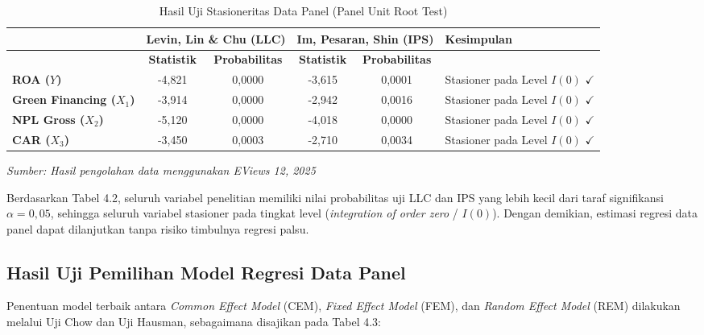 \documentclass[12pt,a4paper]{article}
\numberwithin{equation}{section}
\begin{document}
\begin{table}[H]
  \caption{Hasil Uji Stasioneritas Data Panel (Panel Unit Root Test)}
  \label{tab:unit_root}
  \begin{tabularx}{\textwidth}{|>{\raggedright\arraybackslash}p{2.4cm}|c|c|c|c|>{\raggedright\arraybackslash}X|}
    \hline
    \multirow{2}{*}{\textbf{Variabel}} & \multicolumn{2}{c|}{\textbf{Levin, Lin \& Chu (LLC)}} & \multicolumn{2}{c|}{\textbf{Im, Pesaran, Shin (IPS)}} & \multirow{2}{*}{\textbf{Kesimpulan}} \\
    \cline{2-5}
    & \textbf{Statistik} & \textbf{Probabilitas} & \textbf{Statistik} & \textbf{Probabilitas} & \\
    \hline
    \textbf{ROA ($Y$)} & -4,821 & 0,0000 & -3,615 & 0,0001 & Stasioner pada Level $I(0)$ $\checkmark$ \\
    \hline
    \textbf{Green Financing ($X_1$)} & -3,914 & 0,0000 & -2,942 & 0,0016 & Stasioner pada Level $I(0)$ $\checkmark$ \\
    \hline
    \textbf{NPL Gross ($X_2$)} & -5,120 & 0,0000 & -4,018 & 0,0000 & Stasioner pada Level $I(0)$ $\checkmark$ \\
    \hline
    \textbf{CAR ($X_3$)} & -3,450 & 0,0003 & -2,710 & 0,0034 & Stasioner pada Level $I(0)$ $\checkmark$ \\
    \hline
  \end{tabularx}
  \begin{flushleft}
    \textit{Sumber: Hasil pengolahan data menggunakan EViews 12, 2025}
  \end{flushleft}
\end{table}

\noindent
Berdasarkan Tabel 4.2, seluruh variabel penelitian memiliki nilai probabilitas uji LLC dan IPS yang lebih kecil dari taraf signifikansi $\alpha = 0{,}05$, sehingga seluruh variabel stasioner pada tingkat level (\emph{integration of order zero} / $I(0)$). Dengan demikian, estimasi regresi data panel dapat dilanjutkan tanpa risiko timbulnya regresi palsu.

\subsection{Hasil Uji Pemilihan Model Regresi Data Panel}

\noindent
Penentuan model terbaik antara \emph{Common Effect Model} (CEM), \emph{Fixed Effect Model} (FEM), dan \emph{Random Effect Model} (REM) dilakukan melalui Uji Chow dan Uji Hausman, sebagaimana disajikan pada Tabel 4.3:
\end{document}
